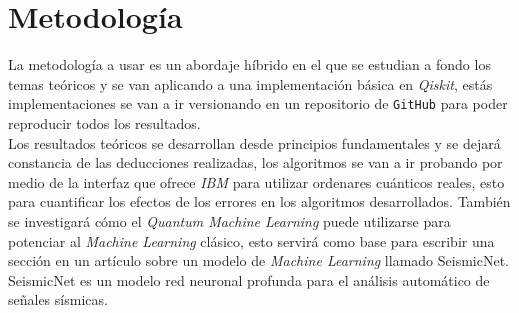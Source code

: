 \documentclass[a4paper]{article}
\begin{document}
\section{Metodología}
La metodología a usar es un abordaje híbrido en el que se estudian a fondo los temas teóricos y se van aplicando a una implementación básica en \textit{Qiskit}, estás implementaciones se van a ir versionando en un repositorio de \texttt{GitHub} para poder reproducir todos los resultados.\\

Los resultados teóricos se desarrollan desde principios fundamentales y se dejará constancia de las deducciones realizadas, los algoritmos se van a ir probando por medio de la interfaz que ofrece \textit{IBM} para utilizar ordenares cuánticos reales, esto para cuantificar los efectos de los errores en los algoritmos desarrollados. También se investigará cómo el \textit{Quantum Machine Learning} puede utilizarse para potenciar al \textit{Machine Learning} clásico, esto servirá como base para escribir una sección en un artículo sobre un modelo de \textit{Machine Learning} llamado SeismicNet. SeismicNet es un modelo red neuronal profunda para el análisis automático de señales sísmicas.
\end{document}
